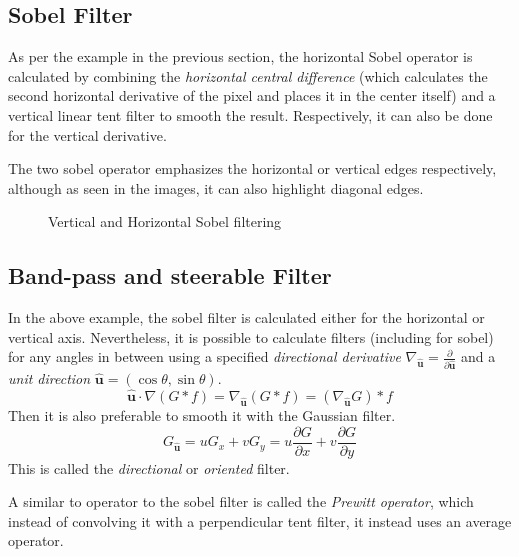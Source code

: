 \documentclass[twoside,a4paper,article]{combine}
\begin{document}
\subsection{Sobel Filter}
As per the example in the previous section, the horizontal Sobel operator is calculated by combining the \emph{horizontal central difference}
(which calculates the second horizontal derivative of the pixel and places it in the center itself) and a vertical linear tent filter to smooth the result. Respectively, it can also
be done for the vertical derivative.

The two sobel operator emphasizes the horizontal or vertical edges respectively, although as seen in the images, it can also highlight diagonal edges.\\
\begin{minipage}{\textwidth}\begin{figure}[H]
    \centering
    \caption{Vertical and Horizontal Sobel filtering\cite{NASA_on_The_Commons_2023}}\label{fig:sobel}
\end{figure}\end{minipage}

\subsection{Band-pass and steerable Filter}
In the above example, the sobel filter is calculated either for the horizontal or
vertical axis. Nevertheless, it is possible to calculate filters (including for sobel) for any angles in between using a specified 
\emph{directional derivative} $\nabla_{\boldsymbol{\hat{u}}} = \frac{\partial}{\partial\boldsymbol{\hat{u}}}$ 
and a \emph{unit direction} $\boldsymbol{\hat{u}} = (\cos \theta, \sin \theta)$\cite{Szeliski_2022}.
\[
    \boldsymbol{\hat{u}} \cdot \nabla (G \ast f) = \nabla_{\boldsymbol{\hat{u}}}(G \ast f) = (\nabla_{\boldsymbol{\hat{u}}}G) \ast  f
\]
Then it is also preferable to smooth it with the Gaussian filter.
\[
    G_{\boldsymbol{\hat{u}}} = u G_x + v G_y = u \frac{\partial G}{\partial x} + v \frac{\partial G}{\partial y} 
\]
This is called the \emph{directional} or \emph{oriented} filter.

A similar to operator to the sobel filter is called the \emph{Prewitt operator}, which instead of convolving it with a perpendicular tent filter,
it instead uses an average operator.\cite{NIXON2020141}
\end{document}
